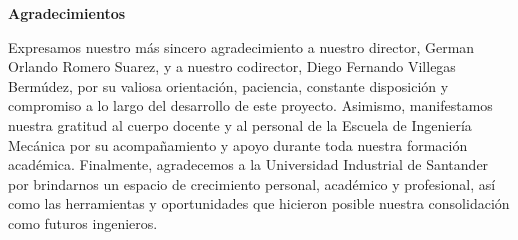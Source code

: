 \begin{center}
\textbf{Agradecimientos}\par
\end{center}

\vspace{\baselineskip}

Expresamos nuestro más sincero agradecimiento a nuestro director, German Orlando Romero Suarez, y a nuestro codirector, Diego Fernando Villegas Bermúdez, por su valiosa orientación, paciencia, constante disposición y compromiso a lo largo del desarrollo de este proyecto. Asimismo, manifestamos nuestra gratitud al cuerpo docente y al personal de la Escuela de Ingeniería Mecánica por su acompañamiento y apoyo durante toda nuestra formación académica. Finalmente, agradecemos a la Universidad Industrial de Santander por brindarnos un espacio de crecimiento personal, académico y profesional, así como las herramientas y oportunidades que hicieron posible nuestra consolidación como futuros ingenieros.